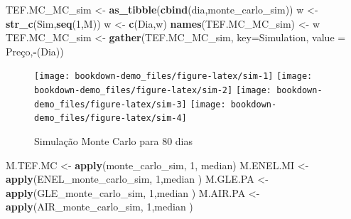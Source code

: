 \documentclass[
  12pt,
  a4paper,
  openany]{book}
\newenvironment{Shaded}{\begin{snugshade}}{\end{snugshade}}
\newcommand{\DataTypeTok}[1]{\textcolor[rgb]{0.13,0.29,0.53}{#1}}
\newcommand{\DecValTok}[1]{\textcolor[rgb]{0.00,0.00,0.81}{#1}}
\newcommand{\KeywordTok}[1]{\textcolor[rgb]{0.13,0.29,0.53}{\textbf{#1}}}
\newcommand{\NormalTok}[1]{#1}
\newcommand{\OperatorTok}[1]{\textcolor[rgb]{0.81,0.36,0.00}{\textbf{#1}}}
\newcommand{\StringTok}[1]{\textcolor[rgb]{0.31,0.60,0.02}{#1}}
\begin{document}
\begin{Shaded}
\begin{Highlighting}[]
\NormalTok{TEF.MC\_MC\_sim \textless{}{-}}\StringTok{ }\KeywordTok{as\_tibble}\NormalTok{(}\KeywordTok{cbind}\NormalTok{(dia,monte\_carlo\_sim))}
\NormalTok{w \textless{}{-}}\StringTok{ }\KeywordTok{str\_c}\NormalTok{(}\StringTok{\textquotesingle{}Sim\textquotesingle{}}\NormalTok{,}\KeywordTok{seq}\NormalTok{(}\DecValTok{1}\NormalTok{,M))}
\NormalTok{w \textless{}{-}}\StringTok{ }\KeywordTok{c}\NormalTok{(}\StringTok{\textquotesingle{}Dia\textquotesingle{}}\NormalTok{,w)}
\KeywordTok{names}\NormalTok{(TEF.MC\_MC\_sim) \textless{}{-}}\StringTok{ }\NormalTok{w}
\NormalTok{TEF.MC\_MC\_sim \textless{}{-}}\StringTok{ }\KeywordTok{gather}\NormalTok{(TEF.MC\_MC\_sim, }\DataTypeTok{key=}\StringTok{\textquotesingle{}Simulation\textquotesingle{}}\NormalTok{, }\DataTypeTok{value =} \StringTok{\textquotesingle{}Preço\textquotesingle{}}\NormalTok{,}\OperatorTok{{-}}\NormalTok{(Dia))}
\end{Highlighting}
\end{Shaded}

\normalsize

\begin{figure}

{\centering \texttt{[image: bookdown-demo\_files/figure-latex/sim-1]} \texttt{[image: bookdown-demo\_files/figure-latex/sim-2]} \texttt{[image: bookdown-demo\_files/figure-latex/sim-3]} \texttt{[image: bookdown-demo\_files/figure-latex/sim-4]} 

}

\caption{Simulação Monte Carlo para 80 dias}\label{fig:sim}
\end{figure}

\scriptsize

\begin{Shaded}
\begin{Highlighting}[]
\NormalTok{M.TEF.MC \textless{}{-}}\StringTok{ }\KeywordTok{apply}\NormalTok{(monte\_carlo\_sim, }\DecValTok{1}\NormalTok{, median)}
\NormalTok{M.ENEL.MI \textless{}{-}}\StringTok{ }\KeywordTok{apply}\NormalTok{(ENEL\_monte\_carlo\_sim, }\DecValTok{1}\NormalTok{,median )}
\NormalTok{M.GLE.PA \textless{}{-}}\StringTok{ }\KeywordTok{apply}\NormalTok{(GLE\_monte\_carlo\_sim, }\DecValTok{1}\NormalTok{,median )}
\NormalTok{M.AIR.PA \textless{}{-}}\StringTok{ }\KeywordTok{apply}\NormalTok{(AIR\_monte\_carlo\_sim, }\DecValTok{1}\NormalTok{,median )}
\end{Highlighting}
\end{Shaded}
\end{document}
